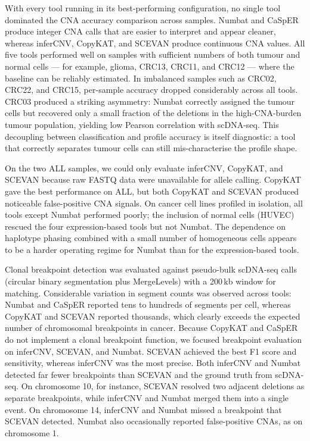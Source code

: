 \documentclass[11pt]{article}
\begin{document}
With every tool running in its best-performing configuration, no single tool
dominated the CNA accuracy comparison across samples. Numbat and CaSpER
produce integer CNA calls that are easier to interpret and appear cleaner,
whereas inferCNV, CopyKAT, and SCEVAN produce continuous CNA values. All
five tools performed well on samples with sufficient numbers of both tumour
and normal cells --- for example, glioma, CRC13, CRC11, and CRC12 --- where
the baseline can be reliably estimated. In imbalanced samples such as
CRC02, CRC22, and CRC15, per-sample accuracy dropped considerably across
all tools. CRC03 produced a striking asymmetry: Numbat correctly assigned
the tumour cells but recovered only a small fraction of the deletions in the
high-CNA-burden tumour population, yielding low Pearson correlation with
scDNA-seq. This decoupling between classification and profile accuracy is
itself diagnostic: a tool that correctly separates tumour cells can still
mis-characterise the profile shape.

On the two ALL samples, we could only evaluate inferCNV, CopyKAT, and SCEVAN
because raw FASTQ data were unavailable for allele calling. CopyKAT gave the
best performance on ALL, but both CopyKAT and SCEVAN produced noticeable
false-positive CNA signals. On cancer cell lines profiled in isolation, all
tools except Numbat performed poorly; the inclusion of normal cells
(HUVEC) rescued the four expression-based tools but not Numbat. The
dependence on haplotype phasing combined with a small number of homogeneous
cells appears to be a harder operating regime for Numbat than for the
expression-based tools.

Clonal breakpoint detection was evaluated against pseudo-bulk scDNA-seq
calls (circular binary segmentation plus MergeLevels) with a 200\,kb window
for matching. Considerable variation in segment counts was observed across
tools: Numbat and CaSpER reported tens to hundreds of segments per cell,
whereas CopyKAT and SCEVAN reported thousands, which clearly exceeds the
expected number of chromosomal breakpoints in cancer. Because CopyKAT and
CaSpER do not implement a clonal breakpoint function, we focused breakpoint
evaluation on inferCNV, SCEVAN, and Numbat. SCEVAN achieved the best F1
score and sensitivity, whereas inferCNV was the most precise. Both inferCNV
and Numbat detected far fewer breakpoints than SCEVAN and the ground truth
from scDNA-seq. On chromosome 10, for instance, SCEVAN resolved two adjacent
deletions as separate breakpoints, while inferCNV and Numbat merged them
into a single event. On chromosome 14, inferCNV and Numbat missed a
breakpoint that SCEVAN detected. Numbat also occasionally reported
false-positive CNAs, as on chromosome 1.
\end{document}
